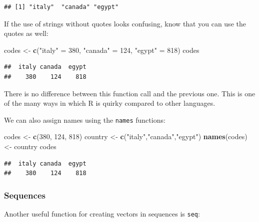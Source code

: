 \documentclass[
]{article}
\newenvironment{Shaded}{\begin{snugshade}}{\end{snugshade}}
\newcommand{\DecValTok}[1]{\textcolor[rgb]{0.00,0.00,0.81}{#1}}
\newcommand{\FunctionTok}[1]{\textcolor[rgb]{0.13,0.29,0.53}{\textbf{#1}}}
\newcommand{\NormalTok}[1]{#1}
\newcommand{\OtherTok}[1]{\textcolor[rgb]{0.56,0.35,0.01}{#1}}
\newcommand{\StringTok}[1]{\textcolor[rgb]{0.31,0.60,0.02}{#1}}
\begin{document}
\begin{verbatim}
## [1] "italy"  "canada" "egypt"
\end{verbatim}

If the use of strings without quotes looks confusing, know that you can
use the quotes as well:

\begin{Shaded}
\begin{Highlighting}[]
\NormalTok{codes }\OtherTok{\textless{}{-}} \FunctionTok{c}\NormalTok{(}\StringTok{"italy"} \OtherTok{=} \DecValTok{380}\NormalTok{, }\StringTok{"canada"} \OtherTok{=} \DecValTok{124}\NormalTok{, }\StringTok{"egypt"} \OtherTok{=} \DecValTok{818}\NormalTok{)}
\NormalTok{codes}
\end{Highlighting}
\end{Shaded}

\begin{verbatim}
##  italy canada  egypt 
##    380    124    818
\end{verbatim}

There is no difference between this function call and the previous one.
This is one of the many ways in which R is quirky compared to other
languages.

We can also assign names using the \texttt{names} functions:

\begin{Shaded}
\begin{Highlighting}[]
\NormalTok{codes }\OtherTok{\textless{}{-}} \FunctionTok{c}\NormalTok{(}\DecValTok{380}\NormalTok{, }\DecValTok{124}\NormalTok{, }\DecValTok{818}\NormalTok{)}
\NormalTok{country }\OtherTok{\textless{}{-}} \FunctionTok{c}\NormalTok{(}\StringTok{"italy"}\NormalTok{,}\StringTok{"canada"}\NormalTok{,}\StringTok{"egypt"}\NormalTok{)}
\FunctionTok{names}\NormalTok{(codes) }\OtherTok{\textless{}{-}}\NormalTok{ country}
\NormalTok{codes}
\end{Highlighting}
\end{Shaded}

\begin{verbatim}
##  italy canada  egypt 
##    380    124    818
\end{verbatim}

\subsubsection{Sequences}\label{sequences}

Another useful function for creating vectors in sequences is
\texttt{seq}:
\end{document}
